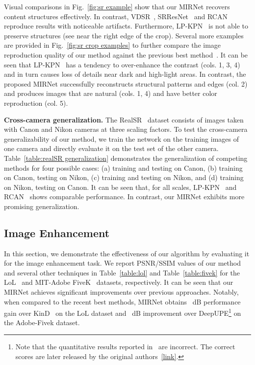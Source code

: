 \documentclass[runningheads]{llncs}
\begin{document}
Visual comparisons in Fig.~\ref{fig:sr example} show that our MIRNet recovers content structures effectively. In contrast, VDSR~\cite{VDSR}, SRResNet~\cite{SRResNet} and RCAN~\cite{RCAN} reproduce results with noticeable artifacts. 
Furthermore, LP-KPN~\cite{RealSR} is not able to preserve structures (see near the right edge of the crop). 
Several more examples are provided in Fig.~\ref{fig:sr crop examples} to further compare the image reproduction quality of our method against the previous best method~\cite{RealSR}.  
It can be seen that LP-KPN~\cite{RealSR} has a tendency to over-enhance the contrast (cols. 1, 3, 4) and in turn causes loss of details near dark and high-light areas.
In contrast, the proposed MIRNet successfully reconstructs structural patterns and edges (col. 2) and produces images that are natural (cols. 1, 4) and have better color reproduction (col. 5). 

\vspace{0.4em}\noindent\textbf{Cross-camera generalization.} The RealSR~\cite{RealSR} dataset consists of images taken with Canon and Nikon cameras at three scaling factors. To test the cross-camera generalizability of our method, we train the network on the training images of one camera and directly evaluate it on the test set of the other camera. Table~\ref{table:realSR generalization} demonstrates the generalization of  competing methods for four possible cases: (a) training and testing on Canon, (b) training on Canon, testing on Nikon, (c) training and testing on Nikon, and (d) training on Nikon, testing on Canon. It can be seen that, for all scales, LP-KPN~\cite{RealSR} and RCAN~\cite{RCAN} shows comparable performance. 
In contrast, our MIRNet exhibits more promising generalization. 








\subsection{Image Enhancement}

In this section, we demonstrate the effectiveness of our algorithm by evaluating it for the image enhancement task. 
We report PSNR/SSIM values of our method and several other techniques in Table~\ref{table:lol} and Table~\ref{table:fivek} for the LoL~\cite{wei2018deep} and MIT-Adobe FiveK~\cite{mit_fivek} datasets, respectively. 
It can be seen that our MIRNet achieves significant improvements over previous approaches. 
Notably, when compared to the recent best methods, MIRNet obtains ~dB performance gain over KinD~\cite{zhang2019kindling} on the LoL dataset and ~dB improvement over DeepUPE\footnote{Note that the quantitative results reported in~\cite{wang2019underexposed} are incorrect. The correct scores are later released by the original authors~\href{https://drive.google.com/file/d/1fJ7MQfm6NuCMtfQzLM0Y6LNU9XyQb6Ho/view}{[link]}.} \cite{wang2019underexposed} on the Adobe-Fivek dataset.  
\end{document}
